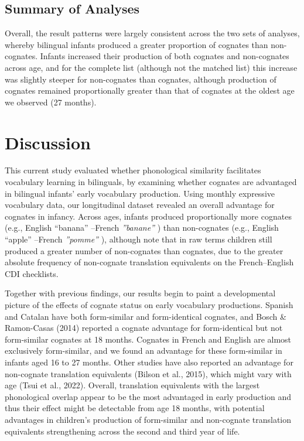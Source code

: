 \documentclass[
  ,man,floatsintext]{apa6}
\begin{document}
\hypertarget{summary-of-analyses}{%
\subsection{Summary of Analyses}\label{summary-of-analyses}}

Overall, the result patterns were largely consistent across the two sets of analyses, whereby bilingual infants produced a greater proportion of cognates than non-cognates. Infants increased their production of both cognates and non-cognates across age, and for the complete list (although not the matched list) this increase was slightly steeper for non-cognates than cognates, although production of cognates remained proportionally greater than that of cognates at the oldest age we observed (27 months).

\hypertarget{discussion}{%
\section{Discussion}\label{discussion}}

This current study evaluated whether phonological similarity facilitates vocabulary learning in bilinguals, by examining whether cognates are advantaged in bilingual infants' early vocabulary production. Using monthly expressive vocabulary data, our longitudinal dataset revealed an overall advantage for cognates in infancy. Across ages, infants produced proportionally more cognates (e.g., English ``banana'' --French \emph{''banane''} ) than non-cognates (e.g., English ``apple'' --French \emph{''pomme''} ), although note that in raw terms children still produced a greater number of non-cognates than cognates, due to the greater absolute frequency of non-cognate translation equivalents on the French--English CDI checklists.

Together with previous findings, our results begin to paint a developmental picture of the effects of cognate status on early vocabulary productions. Spanish and Catalan have both form-similar and form-identical cognates, and Bosch \& Ramon-Casas (2014) reported a cognate advantage for form-identical but not form-similar cognates at 18 months. Cognates in French and English are almost exclusively form-similar, and we found an advantage for these form-similar in infants aged 16 to 27 months. Other studies have also reported an advantage for non-cognate translation equivalents (Bilson et al., 2015), which might vary with age (Tsui et al., 2022). Overall, translation equivalents with the largest phonological overlap appear to be the most advantaged in early production and thus their effect might be detectable from age 18 months, with potential advantages in children's production of form-similar and non-cognate translation equivalents strengthening across the second and third year of life.
\end{document}
